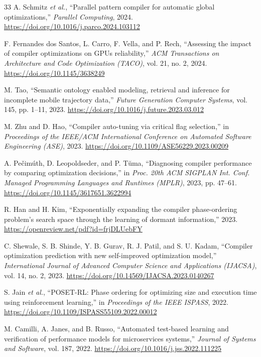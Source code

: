 \documentclass[conference]{IEEEtran}
\begin{document}
\begin{thebibliography}{33}
A. Schmitz \textit{et al.},
``Parallel pattern compiler for automatic global optimizations,''
\textit{Parallel Computing}, 2024.
\url{https://doi.org/10.1016/j.parco.2024.103112}

F. Fernandes dos Santos, L. Carro, F. Vella, and P. Rech,
``Assessing the impact of compiler optimizations on GPUs reliability,''
\textit{ACM Transactions on Architecture and Code Optimization (TACO)},
vol. 21, no. 2, 2024.
\url{https://doi.org/10.1145/3638249}

M. Tao,
``Semantic ontology enabled modeling, retrieval and inference for incomplete mobile trajectory data,''
\textit{Future Generation Computer Systems}, vol. 145, pp. 1--11, 2023.
\url{https://doi.org/10.1016/j.future.2023.03.012}

M. Zhu and D. Hao,
``Compiler auto-tuning via critical flag selection,''
in \textit{Proceedings of the IEEE/ACM International Conference on Automated Software Engineering (ASE)}, 2023.
\url{https://doi.org/10.1109/ASE56229.2023.00209}

A. Pe\v{c}im\'{u}th, D. Leopoldseder, and P. T\u{u}ma,
``Diagnosing compiler performance by comparing optimization decisions,''
in \textit{Proc. 20th ACM SIGPLAN Int. Conf. Managed Programming Languages and Runtimes (MPLR)}, 2023, pp. 47--61.
\url{https://doi.org/10.1145/3617651.3622994}

R. Han and H. Kim,
``Exponentially expanding the compiler phase-ordering problem's search space through the learning of dormant information,''
2023.
\url{https://openreview.net/pdf?id=frjDLUebFY}

C. Shewale, S. B. Shinde, Y. B. Gurav, R. J. Patil, and S. U. Kadam,
``Compiler optimization prediction with new self-improved optimization model,''
\textit{International Journal of Advanced Computer Science and Applications (IJACSA)}, vol. 14, no. 2, 2023.
\url{https://doi.org/10.14569/IJACSA.2023.0140267}

S. Jain \textit{et al.},
``POSET-RL: Phase ordering for optimizing size and execution time using reinforcement learning,''
in \textit{Proceedings of the IEEE ISPASS}, 2022.
\url{https://doi.org/10.1109/ISPASS55109.2022.00012}

M. Camilli, A. Janes, and B. Russo,
``Automated test-based learning and verification of performance models for microservices systems,''
\textit{Journal of Systems and Software}, vol. 187, 2022.
\url{https://doi.org/10.1016/j.jss.2022.111225}


\end{thebibliography}
\end{document}
